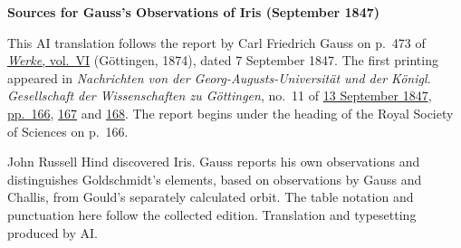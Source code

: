 \clearpage\thispagestyle{empty}
\begin{center}\textbf{Sources for Gauss’s Observations of Iris (September 1847)}\end{center}
\noindent This AI translation follows the report by Carl Friedrich Gauss on p.~473 of \href{https://gdz.sub.uni-goettingen.de/id/PPN236007467}{\textit{Werke}, vol.~VI} (Göttingen, 1874), dated 7 September 1847. The first printing appeared in \textit{Nachrichten von der Georg-Augusts-Universität und der Königl. Gesellschaft der Wissenschaften zu Göttingen}, no.~11 of \href{https://images.p.sub.uni-goettingen.de/iiif/image/gdz:PPN668664029_0003:00000163/full/1800,/0/default.jpg}{13 September 1847}, \href{https://images.p.sub.uni-goettingen.de/iiif/image/gdz:PPN668664029_0003:00000168/full/1800,/0/default.jpg}{pp.~166}, \href{https://images.p.sub.uni-goettingen.de/iiif/image/gdz:PPN668664029_0003:00000169/full/1800,/0/default.jpg}{167} and \href{https://images.p.sub.uni-goettingen.de/iiif/image/gdz:PPN668664029_0003:00000170/full/1800,/0/default.jpg}{168}. The report begins under the heading of the Royal Society of Sciences on p.~166.
\par\smallskip\noindent John Russell Hind discovered Iris. Gauss reports his own observations and distinguishes Goldschmidt’s elements, based on observations by Gauss and Challis, from Gould’s separately calculated orbit. The table notation and punctuation here follow the collected edition. Translation and typesetting produced by AI.
\clearpage
